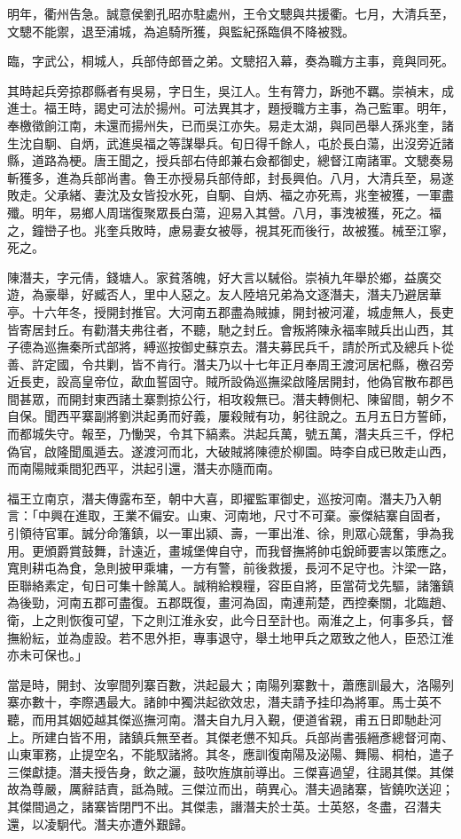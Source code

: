 \begin{pinyinscope}
{{明年，衢州告急。誠意侯劉孔昭亦駐處州，王令文驄與共援衢。七月，大清兵至，文驄不能禦，退至浦城，為追騎所獲，與監紀孫臨俱不降被戮。

臨，字武公，桐城人，兵部侍郎晉之弟。文驄招入幕，奏為職方主事，竟與同死。

其時起兵旁掠郡縣者有吳易，字日生，吳江人。生有膂力，跅弛不羈。崇禎末，成進士。福王時，謁史可法於揚州。可法異其才，題授職方主事，為己監軍。明年，奉檄徵餉江南，未還而揚州失，已而吳江亦失。易走太湖，與同邑舉人孫兆奎，諸生沈自駉、自炳，武進吳福之等謀舉兵。旬日得千餘人，屯於長白蕩，出沒旁近諸縣，道路為梗。唐王聞之，授兵部右侍郎兼右僉都御史，總督江南諸軍。文驄奏易斬獲多，進為兵部尚書。魯王亦授易兵部侍郎，封長興伯。八月，大清兵至，易遂敗走。父承緒、妻沈及女皆投水死，自駉、自炳、福之亦死焉，兆奎被獲，一軍盡殲。明年，易鄉人周瑞復聚眾長白蕩，迎易入其營。八月，事洩被獲，死之。福之，鐘巒子也。兆奎兵敗時，慮易妻女被辱，視其死而後行，故被獲。械至江寧，死之。

陳潛夫，字元倩，錢塘人。家貧落魄，好大言以駴俗。崇禎九年舉於鄉，益廣交遊，為豪舉，好臧否人，里中人惡之。友人陸培兄弟為文逐潛夫，潛夫乃避居華亭。十六年冬，授開封推官。大河南五郡盡為賊據，開封被河灌，城虛無人，長吏皆寄居封丘。有勸潛夫弗往者，不聽，馳之封丘。會叛將陳永福率賊兵出山西，其子德為巡撫秦所式部將，縛巡按御史蘇京去。潛夫募民兵千，請於所式及總兵卜從善、許定國，令共剿，皆不肯行。潛夫乃以十七年正月奉周王渡河居杞縣，檄召旁近長吏，設高皇帝位，歃血誓固守。賊所設偽巡撫梁啟隆居開封，他偽官散布郡邑間甚眾，而開封東西諸土寨剽掠公行，相攻殺無已。潛夫轉側杞、陳留間，朝夕不自保。聞西平寨副將劉洪起勇而好義，屢殺賊有功，躬往說之。五月五日方誓師，而都城失守。報至，乃慟哭，令其下縞素。洪起兵萬，號五萬，潛夫兵三千，俘杞偽官，啟隆聞風遁去。遂渡河而北，大破賊將陳德於柳園。時李自成已敗走山西，而南陽賊乘間犯西平，洪起引還，潛夫亦隨而南。

福王立南京，潛夫傳露布至，朝中大喜，即擢監軍御史，巡按河南。潛夫乃入朝言：「中興在進取，王業不偏安。山東、河南地，尺寸不可棄。豪傑結寨自固者，引領待官軍。誠分命籓鎮，以一軍出潁、壽，一軍出淮、徐，則眾心競奮，爭為我用。更頒爵賞鼓舞，計遠近，畫城堡俾自守，而我督撫將帥屯銳師要害以策應之。寬則耕屯為食，急則披甲乘墉，一方有警，前後救援，長河不足守也。汴梁一路，臣聯絡素定，旬日可集十餘萬人。誠稍給糗糧，容臣自將，臣當荷戈先驅，諸籓鎮為後勁，河南五郡可盡復。五郡既復，畫河為固，南連荊楚，西控秦關，北臨趙、衛，上之則恢復可望，下之則江淮永安，此今日至計也。兩淮之上，何事多兵，督撫紛紜，並為虛設。若不思外拒，專事退守，舉土地甲兵之眾致之他人，臣恐江淮亦未可保也。」

當是時，開封、汝寧間列寨百數，洪起最大；南陽列寨數十，蕭應訓最大，洛陽列寨亦數十，李際遇最大。諸帥中獨洪起欲效忠，潛夫請予挂印為將軍。馬士英不聽，而用其姻婭越其傑巡撫河南。潛夫自九月入覲，便道省親，甫五日即馳赴河上。所建白皆不用，諸鎮兵無至者。其傑老憊不知兵。兵部尚書張縉彥總督河南、山東軍務，止提空名，不能馭諸將。其冬，應訓復南陽及泌陽、舞陽、桐柏，遣子三傑獻捷。潛夫授告身，飲之灑，鼓吹旌旗前導出。三傑喜過望，往謁其傑。其傑故為尊嚴，厲辭詰責，詆為賊。三傑泣而出，萌異心。潛夫過諸寨，皆鐃吹送迎；其傑間過之，諸寨皆閉門不出。其傑恚，譖潛夫於士英。士英怒，冬盡，召潛夫還，以凌駉代。潛夫亦遭外艱歸。

}}
\end{pinyinscope}
